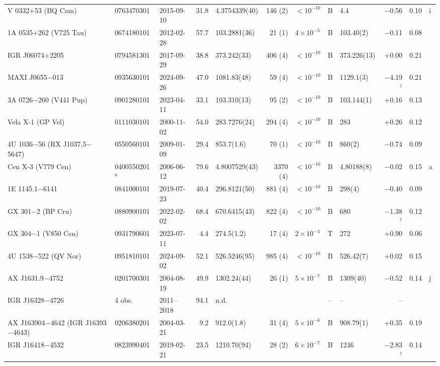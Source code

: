 \begin{longtable}{@{}l@{\hspace{5pt}\extracolsep{\fill}}l l r l r l c l r r l@{}}
V 0332$+$53 (BQ Cam) & 0763470301 & 2015-09-10 & 31.8 & 4.3754339(40) & 146 (2) & $<10^{-10}$ & B & 4.4 & $-$0.56 & 0.10 & i \\
1A 0535$+$262 (V725 Tau) & 0674180101 & 2012-02-28 & 57.7 & 103.2881(36) & 21 (1) & $4\times10^{-5}$ & B & 103.40(2) & $-$0.11 & 0.08 &  \\
IGR J06074$+$2205 & 0794581301 & 2017-09-29 & 38.8 & 373.242(33) & 406 (4) & $<10^{-10}$ & B & 373.226(13) & +0.00 & 0.21 &  \\
MAXI J0655$-$013 & 0935630101 & 2024-09-26 & 47.0 & 1081.83(48) & 59 (4) & $<10^{-10}$ & B & 1129.1(3) & $-$4.19$^\dagger$ & 0.21 &  \\
3A 0726$-$260 (V441 Pup) & 0901280101 & 2023-04-11 & 33.1 & 103.310(13) & 95 (2) & $<10^{-10}$ & B & 103.144(1) & +0.16 & 0.13 &  \\
Vela X-1 (GP Vel) & 0111030101 & 2000-11-02 & 54.0 & 283.7276(24) & 294 (4) & $<10^{-10}$ & B & 283 & +0.26 & 0.12 &  \\
4U 1036$-$56 (RX J1037.5$-$5647) & 0550560101 & 2009-01-09 & 29.4 & 853.7(1.6) & 70 (1) & $<10^{-10}$ & B & 860(2) & $-$0.74 & 0.09 &  \\
Cen X-3 (V779 Cen) & 0400550201$^{\rm s}$ & 2006-06-12 & 79.6 & 4.8007529(43) & 3370 (4) & $<10^{-10}$ & B & 4.80188(8) & $-$0.02 & 0.15 & a \\
1E 1145.1$-$6141 & 0841000101 & 2019-07-23 & 40.4 & 296.8121(50) & 881 (4) & $<10^{-10}$ & B & 298(4) & $-$0.40 & 0.09 &  \\
GX 301$-$2 (BP Cru) & 0880900101 & 2022-02-02 & 68.4 & 670.6415(43) & 822 (4) & $<10^{-10}$ & B & 680 & $-$1.38$^\dagger$ & 0.12 &  \\
GX 304$-$1 (V850 Cen) & 0931790601 & 2023-07-11 & 4.4 & 274.5(1.2) & 17 (4) & $2\times10^{-4}$ & T & 272 & +0.90 & 0.06 &  \\
4U 1538$-$522 (QV Nor) & 0951810101 & 2024-09-02 & 52.1 & 526.5246(95) & 985 (4) & $<10^{-10}$ & B & 526.42(7) & +0.02 & 0.15 &  \\
AX J1631.9$-$4752 & 0201700301 & 2004-08-19 & 49.9 & 1302.24(44) & 26 (1) & $5\times10^{-7}$ & B & 1309(40) & $-$0.52 & 0.14 & j \\
IGR J16328$-$4726 & 4 obs. & 2011--2018 & 94.1 & n.d. &  &  & -- & -- & -- &  &  \\
AX J163904$-$4642 (IGR J16393$-$4643) & 0206380201 & 2004-03-21 & 9.2 & 912.0(1.8) & 31 (4) & $5\times10^{-6}$ & B & 908.79(1) & +0.35 & 0.19 &  \\
IGR J16418$-$4532 & 0823990401 & 2019-02-21 & 23.5 & 1210.70(94) & 28 (2) & $6\times10^{-7}$ & B & 1246 & $-$2.83$^\dagger$ & 0.14 &  \\

\end{longtable}
